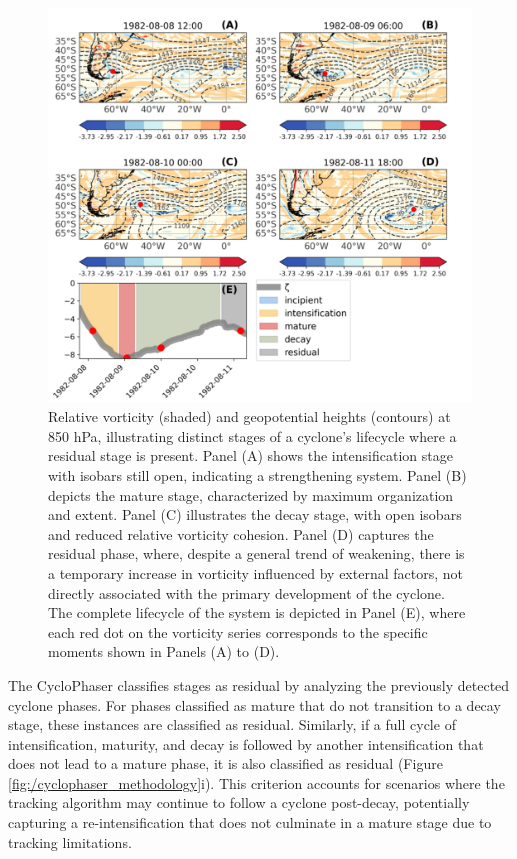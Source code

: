 \begin{figure}[h!]
\centering
\includegraphics[width=37pc]{figs_3/residual_study_case_edited.pdf}
\caption[Residual Stage - Study case]{Relative vorticity (shaded) and geopotential heights (contours) at 850 hPa, illustrating distinct stages of a cyclone's lifecycle where a residual stage is present. Panel (A) shows the intensification stage with isobars still open, indicating a strengthening system. Panel (B) depicts the mature stage, characterized by maximum organization and extent. Panel (C) illustrates the decay stage, with open isobars and reduced relative vorticity cohesion. Panel (D) captures the residual phase, where, despite a general trend of weakening, there is a temporary increase in vorticity influenced by external factors, not directly associated with the primary development of the cyclone. The complete lifecycle of the system is depicted in Panel (E), where each red dot on the vorticity series corresponds to the specific moments shown in Panels (A) to (D).}
\label{residual_study_case}
\end{figure}

The CycloPhaser classifies stages as residual by analyzing the previously detected cyclone phases. For phases classified as mature that do not transition to a decay stage, these instances are classified as residual. Similarly, if a full cycle of intensification, maturity, and decay is followed by another intensification that does not lead to a mature phase, it is also classified as residual (Figure \ref{fig:/cyclophaser_methodology}i). This criterion accounts for scenarios where the tracking algorithm may continue to follow a cyclone post-decay, potentially capturing a re-intensification that does not culminate in a mature stage due to tracking limitations.

